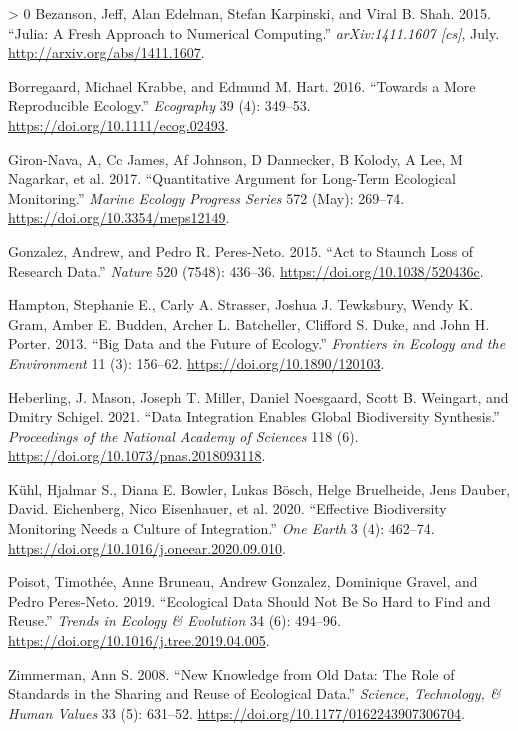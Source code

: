 \documentclass[11pt]{article}
\newlength{\cslhangindent}
\newenvironment{CSLReferences}[3] %
 {%
  \setlength{\parindent}{0pt}
  \ifodd #1 \everypar{\setlength{\hangindent}{\cslhangindent}}\ignorespaces\fi
  \ifnum #2 > 0
  \setlength{\parskip}{#2\baselineskip}
  \fi
 }%
 {}
\begin{document}
\hypertarget{refs}{}
\begin{CSLReferences}{1}{0}
\leavevmode\hypertarget{ref-Bezanson2015JulFre}{}%
Bezanson, Jeff, Alan Edelman, Stefan Karpinski, and Viral B. Shah. 2015.
{``Julia: A Fresh Approach to Numerical Computing.''}
\emph{arXiv:1411.1607 {[}cs{]}}, July.
\url{http://arxiv.org/abs/1411.1607}.

\leavevmode\hypertarget{ref-Borregaard2016MorRep}{}%
Borregaard, Michael Krabbe, and Edmund M. Hart. 2016. {``Towards a More
Reproducible Ecology.''} \emph{Ecography} 39 (4): 349--53.
\url{https://doi.org/10.1111/ecog.02493}.

\leavevmode\hypertarget{ref-Giron-Nava2017QuaArg}{}%
Giron-Nava, A, Cc James, Af Johnson, D Dannecker, B Kolody, A Lee, M
Nagarkar, et al. 2017. {``Quantitative Argument for Long-Term Ecological
Monitoring.''} \emph{Marine Ecology Progress Series} 572 (May): 269--74.
\url{https://doi.org/10.3354/meps12149}.

\leavevmode\hypertarget{ref-Gonzalez2015ActSta}{}%
Gonzalez, Andrew, and Pedro R. Peres-Neto. 2015. {``Act to Staunch Loss
of Research Data.''} \emph{Nature} 520 (7548): 436--36.
\url{https://doi.org/10.1038/520436c}.

\leavevmode\hypertarget{ref-Hampton2013BigDat}{}%
Hampton, Stephanie E., Carly A. Strasser, Joshua J. Tewksbury, Wendy K.
Gram, Amber E. Budden, Archer L. Batcheller, Clifford S. Duke, and John
H. Porter. 2013. {``Big Data and the Future of Ecology.''}
\emph{Frontiers in Ecology and the Environment} 11 (3): 156--62.
\url{https://doi.org/10.1890/120103}.

\leavevmode\hypertarget{ref-Heberling2021DatInt}{}%
Heberling, J. Mason, Joseph T. Miller, Daniel Noesgaard, Scott B.
Weingart, and Dmitry Schigel. 2021. {``Data Integration Enables Global
Biodiversity Synthesis.''} \emph{Proceedings of the National Academy of
Sciences} 118 (6). \url{https://doi.org/10.1073/pnas.2018093118}.

\leavevmode\hypertarget{ref-Kuhl2020EffBio}{}%
Kühl, Hjalmar S., Diana E. Bowler, Lukas Bösch, Helge Bruelheide, Jens
Dauber, David. Eichenberg, Nico Eisenhauer, et al. 2020. {``Effective
Biodiversity Monitoring Needs a Culture of Integration.''} \emph{One
Earth} 3 (4): 462--74.
\url{https://doi.org/10.1016/j.oneear.2020.09.010}.

\leavevmode\hypertarget{ref-Poisot2019EcoDat}{}%
Poisot, Timothée, Anne Bruneau, Andrew Gonzalez, Dominique Gravel, and
Pedro Peres-Neto. 2019. {``Ecological Data Should Not Be So Hard to Find
and Reuse.''} \emph{Trends in Ecology \& Evolution} 34 (6): 494--96.
\url{https://doi.org/10.1016/j.tree.2019.04.005}.

\leavevmode\hypertarget{ref-Zimmerman2008NewKno}{}%
Zimmerman, Ann S. 2008. {``New Knowledge from Old Data: The Role of
Standards in the Sharing and Reuse of Ecological Data.''} \emph{Science,
Technology, \& Human Values} 33 (5): 631--52.
\url{https://doi.org/10.1177/0162243907306704}.

\end{CSLReferences}
\end{document}
